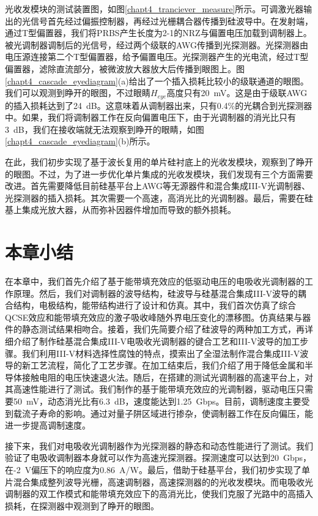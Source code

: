 光收发模块的测试装置图，如图\ref{chapt4_tranciever_measure}所示。可调激光器输出的光信号首先经过偏振控制器，再经过光栅耦合器传播到硅波导中。在发射端，通过T型偏置器，我们将PRBS产生长度为2-1的NRZ与偏置电压加载到调制器上。被光调制器调制后的光信号，经过两个级联的AWG传播到光探测器。光探测器由电压源连接第二个T型偏置器，给予偏置电压。光探测器产生的光电流，经过T型偏置器，滤除直流部分，被微波放大器放大后传播到眼图上。图\ref{chapt4_cascade_eyediagram}(a)给出了一个插入损耗比较小的级联通道的眼图。我们可以观测到睁开的眼图，不过眼睛$H_{eye}$高度只有20~mV。这是由于级联AWG的插入损耗达到了24~dB。这意味着从调制器出来，只有0.4\%的光耦合到光探测器中。如果，我们将调制器工作在反向偏置电压下，由于光调制器的消光比只有3~dB，我们在接收端就无法观察到睁开的眼睛，如图\ref{chapt4_cascade_eyediagram}(b)所示。

在此，我们初步实现了基于波长复用的单片硅衬底上的光收发模块，观察到了睁开的眼图。不过，为了进一步优化单片集成的光收发模块，我们发现有三个方面需要改进。首先需要降低目前硅基平台上AWG等无源器件和混合集成III-V光调制器、光探测器的插入损耗。其次需要一个高速，高消光比的光调制器。最后，需要在硅基上集成光放大器，从而弥补因器件增加而导致的额外损耗。

\section{本章小结}
在本章中，我们首先介绍了基于能带填充效应的低驱动电压的电吸收光调制器的工作原理。然后，我们对调制器的波导结构，硅波导与硅基混合集成III-V波导的耦合结构，电极结构，能带结构进行了设计和仿真。其中，我们首次仿真了综合QCSE效应和能带填充效应的激子吸收峰随外界电压变化的漂移图。仿真结果与器件的静态测试结果相吻合。接着，我们先简要介绍了硅波导的两种加工方式，再详细介绍了制作硅基混合集成III-V电吸收光调制器的键合工艺和III-V波导的加工步骤。我们利用III-V材料选择性腐蚀的特点，摸索出了全湿法制作混合集成III-V波导的新工艺流程，简化了工艺步骤。在加工结束后，我们介绍了用于降低金属和半导体接触电阻的电压快速退火法。随后，在搭建的测试光调制器的高速平台上，对其高速性能进行了测试。我们制作的基于能带填充效应的光调制器，驱动电压只需要50~mV，动态消光比有6.3~dB，速度能达到1.25~Gbps。目前，调制速度主要受到载流子寿命的影响。通过对量子阱区域进行掺杂，使调制器工作在反向偏压，能进一步提高调制速度。

接下来，我们对电吸收光调制器作为光探测器的静态和动态性能进行了测试。我们验证了电吸收调制器本身就可以作为高速光探测器。探测速度可以达到20~Gbps，在-2~V偏压下的响应度为0.86~A/W。最后，借助于硅基平台，我们初步实现了单片混合集成整列波导光栅，高速调制器，高速探测器的的光收发模块。而电吸收光调制器的双工作模式和能带填充效应下的高消光比，使我们克服了光路中的高插入损耗，在探测器中观测到了睁开的眼图。
